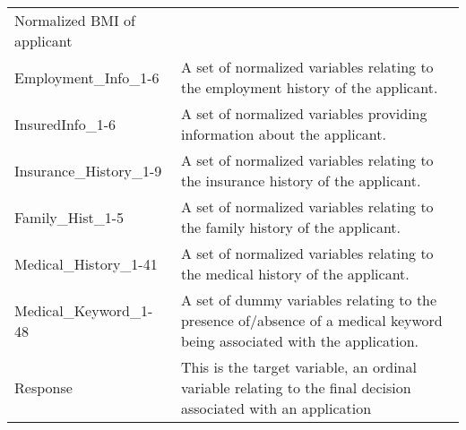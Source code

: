 \documentclass[11pt]{article}
\begin{document}
\begin{longtable}[]{@{}ll@{}}
\begin{minipage}[t]{0.59\columnwidth}
Normalized BMI of applicant\strut
\end{minipage}\tabularnewline
\begin{minipage}[t]{0.35\columnwidth}\raggedright\strut
Employment\_Info\_1-6\strut
\end{minipage} & \begin{minipage}[t]{0.59\columnwidth}\raggedright\strut
A set of normalized variables relating to the employment history of the
applicant.\strut
\end{minipage}\tabularnewline
\begin{minipage}[t]{0.35\columnwidth}\raggedright\strut
InsuredInfo\_1-6\strut
\end{minipage} & \begin{minipage}[t]{0.59\columnwidth}\raggedright\strut
A set of normalized variables providing information about the
applicant.\strut
\end{minipage}\tabularnewline
\begin{minipage}[t]{0.35\columnwidth}\raggedright\strut
Insurance\_History\_1-9\strut
\end{minipage} & \begin{minipage}[t]{0.59\columnwidth}\raggedright\strut
A set of normalized variables relating to the insurance history of the
applicant.\strut
\end{minipage}\tabularnewline
\begin{minipage}[t]{0.35\columnwidth}\raggedright\strut
Family\_Hist\_1-5\strut
\end{minipage} & \begin{minipage}[t]{0.59\columnwidth}\raggedright\strut
A set of normalized variables relating to the family history of the
applicant.\strut
\end{minipage}\tabularnewline
\begin{minipage}[t]{0.35\columnwidth}\raggedright\strut
Medical\_History\_1-41\strut
\end{minipage} & \begin{minipage}[t]{0.59\columnwidth}\raggedright\strut
A set of normalized variables relating to the medical history of the
applicant.\strut
\end{minipage}\tabularnewline
\begin{minipage}[t]{0.35\columnwidth}\raggedright\strut
Medical\_Keyword\_1-48\strut
\end{minipage} & \begin{minipage}[t]{0.59\columnwidth}\raggedright\strut
A set of dummy variables relating to the presence of/absence of a
medical keyword being associated with the application.\strut
\end{minipage}\tabularnewline
\begin{minipage}[t]{0.35\columnwidth}\raggedright\strut
Response\strut
\end{minipage} & \begin{minipage}[t]{0.59\columnwidth}\raggedright\strut
This is the target variable, an ordinal variable relating to the final
decision associated with an application\strut
\end{minipage}\tabularnewline
\bottomrule
\end{longtable}
\end{document}

